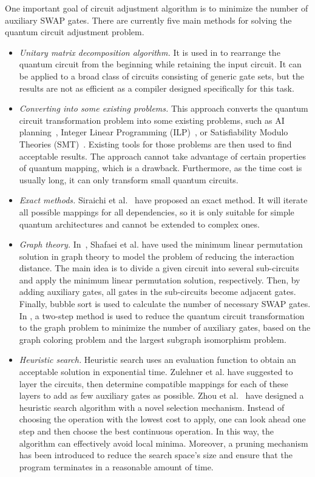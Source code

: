 \documentclass[journal]{IEEEtran}
\begin{document}
	One important goal of circuit adjustment algorithm is to minimize the number of auxiliary SWAP gates. There are currently five main methods for solving the quantum circuit adjustment problem.
	\begin{itemize}
		\item
		\emph{Unitary matrix decomposition algorithm.} It is used in \cite{2019CNOT,2019Quantum} to rearrange the quantum circuit from the beginning while retaining the input circuit. It can be applied to a broad class of circuits consisting of generic gate sets, but the results are not as efficient as a compiler designed specifically for this task.
		\item
		\emph{Converting into some existing problems.} This approach converts the quantum circuit transformation problem into some existing problems, such as AI planning~\cite{2017Temporal,2018Integer}, Integer Linear Programming (ILP)~\cite{2019Almeida}, or Satisfiability Modulo Theories (SMT)~\cite{2019Murali}. Existing tools for those problems are then used to find acceptable results. The approach cannot take advantage of certain properties of quantum mapping, which is a drawback. Furthermore, as the time cost is usually long, it can only transform small quantum circuits.
		\item
		\emph{Exact methods.}
		Siraichi et al.~\cite{2018QubitSiraichi} have proposed an exact method. It will iterate all possible mappings for all dependencies, so it is only suitable for simple quantum architectures and cannot be extended to complex ones.
		\item
		\emph{Graph theory.} 
		In~\cite{Shafaei2013}, Shafaei et al. have used the minimum linear permutation solution in graph theory to model the problem of reducing the interaction distance. The main idea is to divide a given circuit into several  sub-circuits and apply the minimum linear permutation solution, respectively. Then, by adding auxiliary gates, all gates in the sub-circuits become adjacent gates. Finally, bubble sort is used to calculate the number of necessary SWAP gates. In \cite{Guerreschi2018,Matsuo2019}, a two-step method is used to reduce the quantum circuit transformation to the graph problem to minimize the number of auxiliary gates, based on the graph coloring problem and the largest subgraph isomorphism problem.
		\item
		\emph{Heuristic search.}
		Heuristic search uses an evaluation function to obtain an acceptable solution in exponential time. Zulehner et al. \cite{Zulehner2017} have suggested to layer the circuits, then determine compatible mappings for each of these layers to add as few auxiliary gates as possible. Zhou et al.~\cite{Xiangzhen2020} have designed a heuristic search algorithm with a novel selection mechanism. Instead of choosing the operation with the lowest cost to apply, one can look ahead one step and then choose the best continuous operation. In this way, the algorithm can effectively avoid local minima. Moreover, a pruning mechanism has been introduced to reduce the search space's size and ensure that the program terminates in a reasonable amount of time.
		

\end{itemize}
\end{document}
